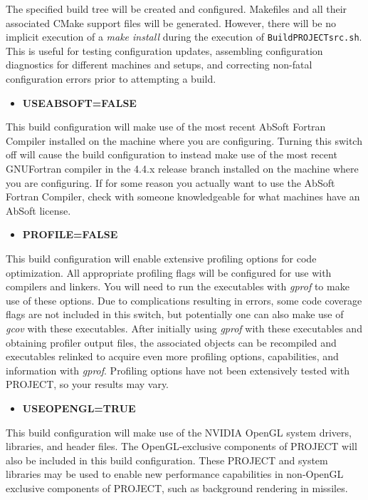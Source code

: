 \documentclass[12pt,letterpaper]{article}
\begin{document}
The specified build tree will be created and configured.  Makefiles and all their associated CMake support files will be generated.  However, there will be no implicit execution of a \emph{make install} during the execution of \verb|BuildPROJECTsrc.sh|.  This is useful for testing configuration updates, assembling configuration diagnostics for different machines and setups, and correcting non-fatal configuration errors prior to attempting a build.

\begin{itemize}
\item \textbf{USEABSOFT=FALSE}
\end{itemize}

This build configuration will make use of the most recent AbSoft Fortran Compiler installed on the machine where you are configuring.  Turning this switch off will cause the build configuration to instead make use of the most recent GNUFortran compiler in the 4.4.x release branch installed on the machine where you are configuring.  If for some reason you actually want to use the AbSoft Fortran Compiler, check with someone knowledgeable for what machines have an AbSoft license.

\begin{itemize}
\item \textbf{PROFILE=FALSE}
\end{itemize}

This build configuration will enable extensive profiling options for code optimization.  All appropriate profiling flags will be configured for use with compilers and linkers.  You will need to run the executables with \emph{gprof} to make use of these options.  Due to complications resulting in errors, some code coverage flags are not included in this switch, but potentially one can also make use of \emph{gcov} with these executables.  After initially using \emph{gprof} with these executables and obtaining profiler output files, the associated objects can be recompiled and executables relinked to acquire even more profiling options, capabilities, and information with \emph{gprof}.  Profiling options have not been extensively tested with PROJECT, so your results may vary.

\begin{itemize}
\item \textbf{USEOPENGL=TRUE}
\end{itemize}

This build configuration will make use of the NVIDIA OpenGL system drivers, libraries, and header files.  The OpenGL-exclusive components of PROJECT will also be included in this build configuration.  These PROJECT and system libraries may be used to enable new performance capabilities in non-OpenGL exclusive components of PROJECT, such as background rendering in missiles.
\end{document}
